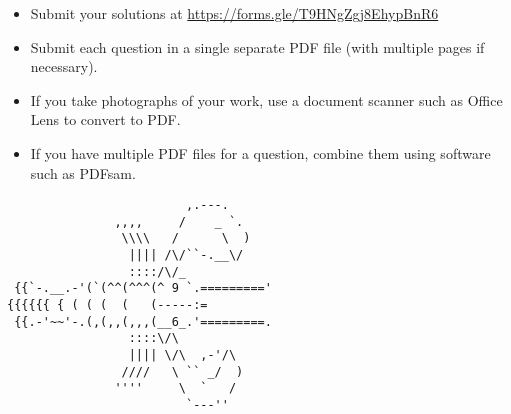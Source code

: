 \documentclass{article}
\begin{document}
\vfill
\begin{itemize}
	\item Submit your solutions at \href{https://forms.gle/T9HNgZgj8EhypBnR6}{https://forms.gle/T9HNgZgj8EhypBnR6}
	\item Submit each question in a single separate PDF file (with multiple pages if necessary).
	\item If you take photographs of your work, use a document scanner such as Office Lens to convert to PDF.
	\item If you have multiple PDF files for a question, combine them using software such as PDFsam.
\end{itemize}

\vfill
\centering
\small
\begin{BVerbatim}
                         ,.---.   
               ,,,,     /    _ `.
                \\\\   /      \  )
                 |||| /\/``-.__\/
                 ::::/\/_
 {{`-.__.-'(`(^^(^^^(^ 9 `.========='
{{{{{{ { ( ( (  (   (-----:=
 {{.-'~~'-.(,(,,(,,,(__6_.'=========.
                 ::::\/\ 
                 |||| \/\  ,-'/\
                ////   \ `` _/  )
               ''''     \  `   /
                         `---''
\end{BVerbatim}
\end{document}
